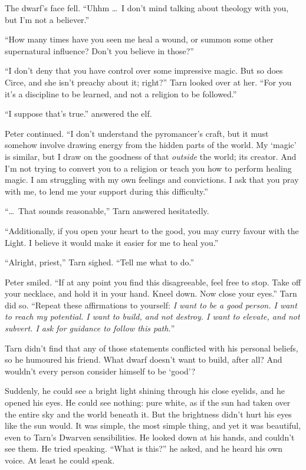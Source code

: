 The dwarf's face fell.  ``Uhhm \ldots\ I don't mind talking about theology with you, but I'm not a believer.''

``How many times have you seen me heal a wound, or summon some other supernatural influence?  Don't you believe in those?''

``I don't deny that you have control over some impressive magic.  But so does Circe, and she isn't preachy about it; right?'' Tarn looked over at her.  ``For you it's a discipline to be learned, and not a religion to be followed.''

``I suppose that's true.'' answered the elf.

Peter continued.  ``I don't understand the pyromancer's craft, but it must somehow involve drawing energy from the hidden parts of the world.  My `magic' is similar, but I draw on the goodness of that \emph{outside} the world; its creator.  And I'm not trying to convert you to a religion or teach you how to perform healing magic.  I am struggling with my own feelings and convictions. I ask that you pray with me, to lend me your support during this difficulty.''

``\ldots\ That sounds reasonable,'' Tarn answered hesitatedly.

``Additionally, if you open your heart to the good, you may curry favour with the Light.  I believe it would make it easier for me to heal you.''

``Alright, priest,'' Tarn sighed.  ``Tell me what to do.''

Peter smiled.  ``If at any point you find this disagreeable, feel free to stop.  Take off your necklace, and hold it in your hand.  Kneel down.  Now close your eyes.''  Tarn did so.  ``Repeat these affirmations to yourself: \emph{I want to be a good person.  I want to reach my potential.  I want to build, and not destroy.  I want to elevate, and not subvert.  I ask for guidance to follow this path.}''

Tarn didn't find that any of those statements conflicted with his personal beliefs, so he humoured his friend.  What dwarf doesn't want to build, after all?  And wouldn't every person consider himself to be `good'?

Suddenly, he could see a bright light shining through his close eyelids, and he opened his eyes.  He could see nothing: pure white, as if the sun had taken over the entire sky and the world beneath it.  But the brightness didn't hurt his eyes like the sun would.  It was simple, the most simple thing, and yet it was beautiful, even to Tarn's Dwarven sensibilities.  He looked down at his hands, and couldn't see them.  He tried speaking.  ``What is this?'' he asked, and he heard his own voice.  At least he could speak.

